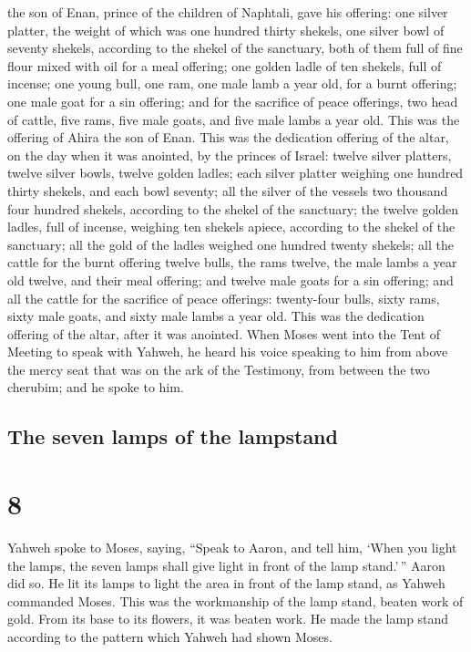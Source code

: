 the son of Enan, prince of the children of Naphtali, 
gave his offering: one silver platter, the weight of which was one
hundred thirty shekels, one silver bowl of seventy shekels, according to
the shekel of the sanctuary, both of them full of fine flour mixed with
oil for a meal offering;  one golden ladle of ten
shekels, full of incense;  one young bull, one ram, one
male lamb a year old, for a burnt offering;  one male
goat for a sin offering;  and for the sacrifice of peace
offerings, two head of cattle, five rams, five male goats, and five male
lambs a year old. This was the offering of Ahira the son of Enan.
 This was the dedication offering of the altar, on the
day when it was anointed, by the princes of Israel: twelve silver
platters, twelve silver bowls, twelve golden ladles; 
each silver platter weighing one hundred thirty shekels, and each bowl
seventy; all the silver of the vessels two thousand four hundred
shekels, according to the shekel of the sanctuary;  the
twelve golden ladles, full of incense, weighing ten shekels apiece,
according to the shekel of the sanctuary; all the gold of the ladles
weighed one hundred twenty shekels;  all the cattle for
the burnt offering twelve bulls, the rams twelve, the male lambs a year
old twelve, and their meal offering; and twelve male goats for a sin
offering;  and all the cattle for the sacrifice of peace
offerings: twenty-four bulls, sixty rams, sixty male goats, and sixty
male lambs a year old. This was the dedication offering of the altar,
after it was anointed.  When Moses went into the Tent of
Meeting to speak with Yahweh, he heard his voice speaking to him from
above the mercy seat that was on the ark of the Testimony, from between
the two cherubim; and he spoke to him.

\hypertarget{the-seven-lamps-of-the-lampstand}{%
\subsection{The seven lamps of the
lampstand}\label{the-seven-lamps-of-the-lampstand}}

\hypertarget{section-7}{%
\section{8}\label{section-7}}

 Yahweh spoke to Moses, saying,  ``Speak to
Aaron, and tell him, `When you light the lamps, the seven lamps shall
give light in front of the lamp stand.'\,''  Aaron did so.
He lit its lamps to light the area in front of the lamp stand, as Yahweh
commanded Moses.  This was the workmanship of the lamp
stand, beaten work of gold. From its base to its flowers, it was beaten
work. He made the lamp stand according to the pattern which Yahweh had
shown Moses.

